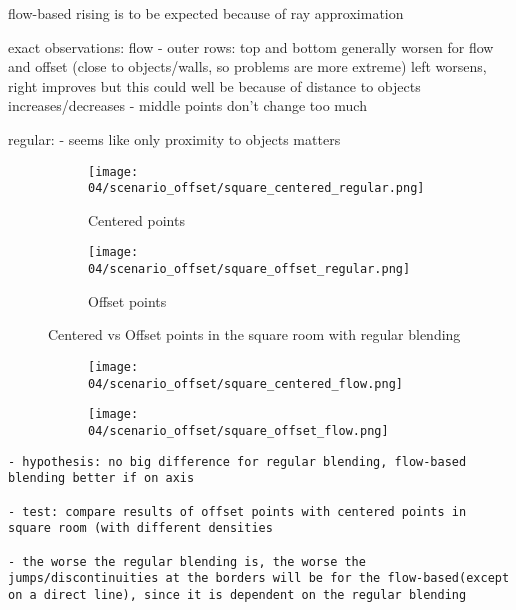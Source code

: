 flow-based rising is to be expected because of ray approximation

exact observations:
flow
- outer rows: top and bottom generally worsen for flow and offset (close to objects/walls, so problems are more extreme) left worsens, right improves but this could well be because of distance to objects increases/decreases
- middle points don't change too much 

regular:
- seems like only proximity to objects matters

\begin{figure}
\centering
    \hfill
    \begin{subfigure}[t]{0.4\textwidth}
            \centering
            \texttt{[image: 04/scenario\_offset/square\_centered\_regular.png]}
            \caption{Centered points}
    \end{subfigure}%
    \hfill
    \begin{subfigure}[t]{0.4\textwidth}
            \centering
            \texttt{[image: 04/scenario\_offset/square\_offset\_regular.png]}
            \caption{Offset points}
    \end{subfigure}
    \hfill
  \caption{Centered vs Offset points in the square room with regular blending} \label{fig:offset_vs_centered_regular}
\end{figure}

\begin{figure}
\centering
    \hfill
    \begin{subfigure}[t]{\textheight}
            \centering
            \texttt{[image: 04/scenario\_offset/square\_centered\_flow.png]}
            \caption{}
    \end{subfigure}
    \hfill

    \hfill
    \begin{subfigure}[t]{\textheight}
            \centering
            \texttt{[image: 04/scenario\_offset/square\_offset\_flow.png]}
            \caption{}
    \end{subfigure}
    \hfill
  \caption{} \label{fig:offset_vs_centered}
\end{figure}


\begin{verbatim}
- hypothesis: no big difference for regular blending, flow-based blending better if on axis

- test: compare results of offset points with centered points in square room (with different densities

- the worse the regular blending is, the worse the jumps/discontinuities at the borders will be for the flow-based(except on a direct line), since it is dependent on the regular blending
\end{verbatim}




